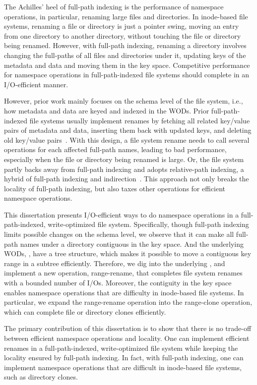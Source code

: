 The Achilles' heel of full-path indexing is the performance of namespace
operations, in particular, renaming large files and directories.
In inode-based file systems,
renaming a file or directory is just a pointer swing,
moving an entry from one directory to another directory,
without touching the file or directory being renamed.
However, with full-path indexing, renaming a directory involves changing the
full-paths of all files and directories under it,
updating keys of the metadata and data and moving them in the key space.
Competitive performance for namespace operations in full-path-indexed file
systems should complete in an I/O-efficient manner.

However, prior work mainly focuses on the schema level of the file system, i.e.,
how metadata and data are keyed and indexed in the WODs.
Prior full-path-indexed file systems usually implement renames by
fetching all related key/value pairs of metadata and data,
inserting them back with updated keys,
and deleting old key/value pairs~\citep{betrfs1,betrfs1tos}.
With this design, a file system rename needs to call several operations for each
affected full-path names, leading to bad performance,
especially when the file or directory being renamed is large.
Or, the file system partly backs away from full-path indexing and adopts
relative-path indexing,
a hybrid of full-path indexing and indirection~\citep{betrfs2,betrfs2tos}.
This approach not only breaks the locality of full-path indexing, but also
taxes other operations for efficient namespace operations.

This dissertation presents I/O-efficient ways to do namespace operations in a
full-path-indexed, write-optimized file system.
Specifically, though full-path indexing limits possible changes on the schema
level, we observe that it can make all full-path names under a directory
contiguous in the key space.
And the underlying WODs, \bets, have a tree structure, which makes it possible
to move a contiguous key range in a subtree efficiently.
Therefore, we dig into the underlying \bets, and implement a new operation,
range-rename, that completes file system renames with a bounded number of I/Os.
Moreover, the contiguity in the key space enables namespace operations that are
difficulty in inode-based file systems.
In particular, we expand the range-rename operation into the range-clone
operation, which can complete file or directory clones efficiently.

The primary contribution of this dissertation is to show that there is no
trade-off between efficient namespace operations and locality.
One can implement efficient renames in a full-path-indexed, write-optimized
file system while keeping the locality ensured by full-path indexing.
In fact, with full-path indexing, one can implement namespace operations that
are difficult in inode-based file systems, such as directory clones.

